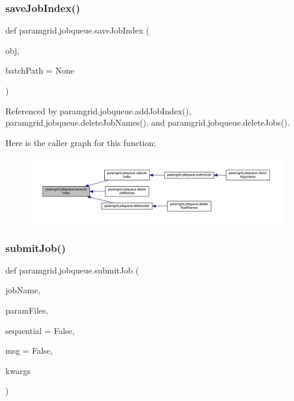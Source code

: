 \subsubsection{\texorpdfstring{save\+Job\+Index()}{saveJobIndex()}}
{\footnotesize\ttfamily def paramgrid.\+jobqueue.\+save\+Job\+Index (\begin{DoxyParamCaption}\item[{}]{obj,  }\item[{}]{batch\+Path = {\ttfamily None} }\end{DoxyParamCaption})}



Referenced by paramgrid.\+jobqueue.\+add\+Job\+Index(), paramgrid.\+jobqueue.\+delete\+Job\+Names(), and paramgrid.\+jobqueue.\+delete\+Jobs().

Here is the caller graph for this function\+:
\nopagebreak
\begin{figure}[H]
\begin{center}
\leavevmode
\includegraphics[width=350pt]{namespaceparamgrid_1_1jobqueue_a691d4fd653c9cc544442a64a98f7d277_icgraph}
\end{center}
\end{figure}
\mbox{\label{namespaceparamgrid_1_1jobqueue_a50c5e49392f8b76bbe9c440187f9cfb5}} 
\subsubsection{\texorpdfstring{submit\+Job()}{submitJob()}}
{\footnotesize\ttfamily def paramgrid.\+jobqueue.\+submit\+Job (\begin{DoxyParamCaption}\item[{}]{job\+Name,  }\item[{}]{param\+Files,  }\item[{}]{sequential = {\ttfamily False},  }\item[{}]{msg = {\ttfamily False},  }\item[{}]{kwargs }\end{DoxyParamCaption})}



